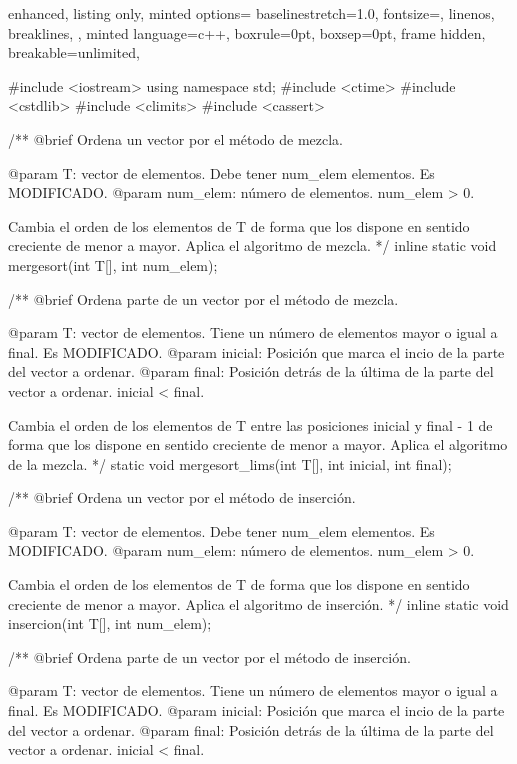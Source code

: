 \documentclass[12pt,spanish]{article}
\begin{document}
\begin{multicols}{2}
\begin{tcblisting}
{
  enhanced,
  listing only,
  minted options={
    baselinestretch=1.0,
    fontsize=\footnotesize,
    linenos,
    breaklines,
  },
  minted language=c++,
  boxrule=0pt,
  boxsep=0pt,
  frame hidden,
  breakable=unlimited,
}
   
#include <iostream>
using namespace std;
#include <ctime>
#include <cstdlib>
#include <climits>
#include <cassert>

/**
   @brief Ordena un vector por el método de mezcla.

   @param T: vector de elementos. Debe tener num_elem elementos.
             Es MODIFICADO.
   @param num_elem: número de elementos. num_elem > 0.

   Cambia el orden de los elementos de T de forma que los dispone
   en sentido creciente de menor a mayor.
   Aplica el algoritmo de mezcla.
*/
inline static 
void mergesort(int T[], int num_elem);

/**
   @brief Ordena parte de un vector por el método de mezcla.

   @param T: vector de elementos. Tiene un número de elementos 
                   mayor o igual a final. Es MODIFICADO.
   @param inicial: Posición que marca el incio de la parte del
                   vector a ordenar.
   @param final: Posición detrás de la última de la parte del
                   vector a ordenar. 
		   inicial < final.

   Cambia el orden de los elementos de T entre las posiciones
   inicial y final - 1 de forma que los dispone en sentido creciente
   de menor a mayor.
   Aplica el algoritmo de la mezcla.
*/
static void mergesort_lims(int T[], int inicial, int final);

/**
   @brief Ordena un vector por el método de inserción.

   @param T: vector de elementos. Debe tener num_elem elementos.
             Es MODIFICADO.
   @param num_elem: número de elementos. num_elem > 0.

   Cambia el orden de los elementos de T de forma que los dispone
   en sentido creciente de menor a mayor.
   Aplica el algoritmo de inserción.
*/
inline static 
void insercion(int T[], int num_elem);

/**
   @brief Ordena parte de un vector por el método de inserción.

   @param T: vector de elementos. Tiene un número de elementos 
                   mayor o igual a final. Es MODIFICADO.
   @param inicial: Posición que marca el incio de la parte del
                   vector a ordenar.
   @param final: Posición detrás de la última de la parte del
                   vector a ordenar. 
		   inicial < final.


\end{tcblisting}
\end{multicols}
\end{document}
